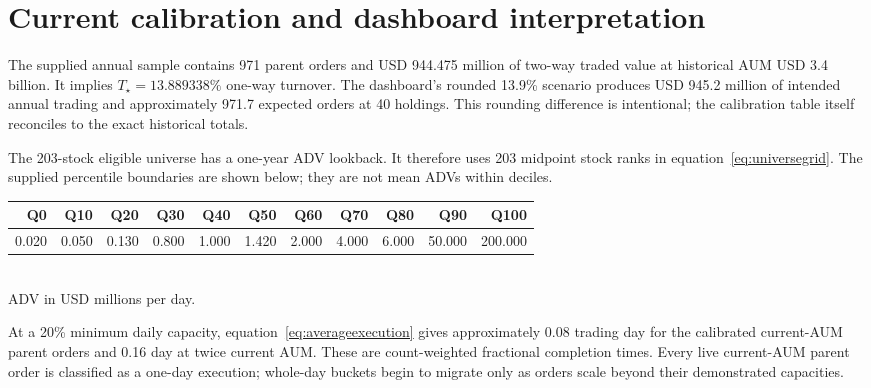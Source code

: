 \documentclass[11pt,a4paper]{article}
\numberwithin{equation}{section}
\begin{document}
\section{Current calibration and dashboard interpretation}
The supplied annual sample contains 971 parent orders and USD 944.475 million of two-way
traded value at historical AUM USD 3.4 billion. It implies $T_\star=13.889338\%$ one-way
turnover. The dashboard's rounded 13.9\% scenario produces USD 945.2 million of intended
annual trading and approximately 971.7 expected orders at 40 holdings. This rounding difference
is intentional; the calibration table itself reconciles to the exact historical totals.

The 203-stock eligible universe has a one-year ADV lookback. It therefore uses 203 midpoint
stock ranks in equation~\eqref{eq:universegrid}. The supplied percentile boundaries
are shown below; they are not mean ADVs within deciles.
\begin{center}
\begin{tabular}{rrrrrrrrrrr}
\toprule
Q0 & Q10 & Q20 & Q30 & Q40 & Q50 & Q60 & Q70 & Q80 & Q90 & Q100\\
\midrule
0.020 & 0.050 & 0.130 & 0.800 & 1.000 & 1.420 & 2.000 & 4.000 & 6.000 & 50.000 & 200.000\\
\bottomrule
\end{tabular}\\[3pt]
\small ADV in USD millions per day.
\end{center}
At a 20\% minimum daily capacity, equation~\eqref{eq:averageexecution} gives approximately 0.08
trading day for the calibrated current-AUM parent orders and 0.16 day at twice current AUM. These
are count-weighted fractional completion times. Every live current-AUM parent order is classified
as a one-day execution; whole-day buckets begin to migrate only as orders scale beyond their
demonstrated capacities.
\end{document}
